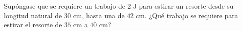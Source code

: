 \item Supóngase que se requiere un trabajo de $2 \text{ J}$ para estirar un resorte desde su longitud natural de $30 \text{ cm}$, hasta una de $42 \text{ cm}$. ¿Qué trabajo se requiere para estirar el resorte de $35 \text{ cm}$ a $40 \text{ cm}$?

